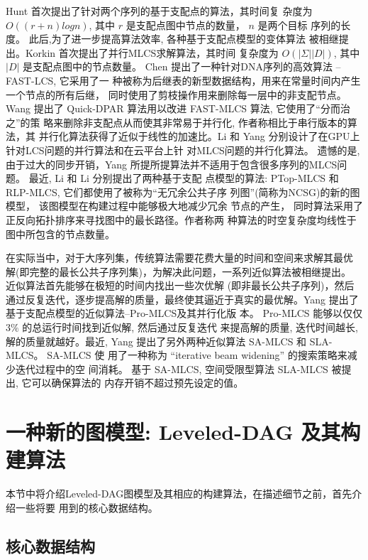 Hunt \cite{Hunt1977} 首次提出了针对两个序列的基于支配点的算法，其时间复
杂度为 $O((r+n)logn)$, 其中 $r$ 是支配点图中节点的数量， $n$ 是两个目标
序列的长度。 此后,为了进一步提高算法效率, 各种基于支配点模型的变体算法
被相继提出。Korkin \cite{Korkin2001} 首次提出了并行MLCS求解算法，其时间
复杂度为 $O(|\Sigma||D|)$, 其中 $|D|$ 是支配点图中的节点数量。 Chen
\cite{Chen2006} 提出了一种针对DNA序列的高效算法 -- FAST-LCS, 它采用了一
种被称为后继表的新型数据结构，用来在常量时间内产生一个节点的所有后继，
同时使用了剪枝操作用来删除每一层中的非支配节点。 Wang \cite{Wang2011}
提出了 Quick-DPAR 算法用以改进 FAST-MLCS 算法, 它使用了“分而治之”的策
略来删除非支配点从而使其非常易于并行化, 作者称相比于串行版本的算法，其
并行化算法获得了近似于线性的加速比。Li \cite{Li2012} 和 Yang
\cite{Yang2010} 分别设计了在GPU上针对LCS问题的并行算法和在云平台上针
对MLCS问题的并行化算法。 遗憾的是, 由于过大的同步开销，Yang
\cite{Yang2010} 所提所提算法并不适用于包含很多序列的MLCS问题。 最近,
Li \cite{Li2016_ICDE} 和 Li \cite{Li2016_SIGKDD} 分别提出了两种基于支配
点模型的算法: PTop-MLCS 和 RLP-MLCS, 它们都使用了被称为“无冗余公共子序
列图”(简称为NCSG)的新的图模型， 该图模型在构建过程中能够极大地减少冗余
节点的产生， 同时算法采用了正反向拓扑排序来寻找图中的最长路径。作者称两
种算法的时空复杂度均线性于图中所包含的节点数量。

在实际当中，对于大序列集，传统算法需要花费大量的时间和空间来求解其最优
解(即完整的最长公共子序列集)，为解决此问题，一系列近似算法被相继提出。
近似算法首先能够在极短的时间内找出一些次优解 (即非最长公共子序列)，然后
通过反复迭代，逐步提高解的质量，最终使其逼近于真实的最优解。Yang
\cite{Yang2013} 提出了基于支配点模型的近似算法--Pro-MLCS及其并行化版
本。 Pro-MLCS 能够以仅仅 $3\%$ 的总运行时间找到近似解, 然后通过反复迭代
来提高解的质量, 迭代时间越长, 解的质量就越好。最近, Yang
\cite{Yang2014} 提出了另外两种近似算法 SA-MLCS 和 SLA-MLCS。 SA-MLCS 使
用了一种称为 “iterative beam widening” 的搜索策略来减少迭代过程中的空
间消耗。 基于 SA-MLCS, 空间受限型算法 SLA-MLCS 被提出, 它可以确保算法的
内存开销不超过预先设定的值。


\section{一种新的图模型: Leveled-DAG 及其构建算法}
\label{sec:Algorithm}

本节中将介绍Leveled-DAG图模型及其相应的构建算法，在描述细节之前，首先介绍一些将要
用到的核心数据结构。

\subsection{核心数据结构}
\label{sec:data structures}

